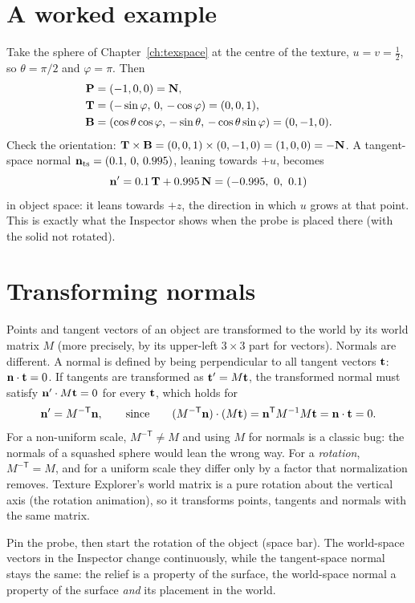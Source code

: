 \section{A worked example}
Take the sphere of Chapter~\ref{ch:texspace} at the centre of the texture, $u=v=\frac12$, so
$\theta=\pi/2$ and $\varphi=\pi$. Then
\begin{align*}
  \mathbf{P} &= (-1,0,0) = \mathbf{N},\\
  \mathbf{T} &= (-\sin\varphi,\,0,\,-\cos\varphi) = (0,0,1),\\
  \mathbf{B} &= (\cos\theta\cos\varphi,\,-\sin\theta,\,-\cos\theta\sin\varphi) = (0,-1,0).
\end{align*}
Check the orientation: $\mathbf{T}\times\mathbf{B} = (0,0,1)\times(0,-1,0) = (1,0,0) = -\mathbf{N}$. A tangent-space
normal $\mathbf{n}_{\mathrm{ts}} = (0.1,\,0,\,0.995)$, leaning towards $+u$, becomes
\[
  \mathbf{n}' = 0.1\,\mathbf{T} + 0.995\,\mathbf{N} = (-0.995,\ 0,\ 0.1)
\]
in object space: it leans towards $+z$, the direction in which $u$ grows at that point. This is
exactly what the Inspector shows when the probe is placed there (with the solid not rotated).

\section{Transforming normals}
\label{sec:normaltransform}

Points and tangent vectors of an object are transformed to the world by its world matrix $M$
(more precisely, by its upper-left $3\times3$ part for vectors). Normals are different. A normal
is defined by being perpendicular to all tangent vectors $\mathbf{t}$: $\mathbf{n}\cdot\mathbf{t} = 0$.
If tangents are transformed as $\mathbf{t}' = M\mathbf{t}$, the transformed normal must satisfy
$\mathbf{n}'\cdot M\mathbf{t} = 0$ for every $\mathbf{t}$, which holds for
\[
  \mathbf{n}' = M^{-\mathsf T}\mathbf{n},\qquad\text{since}\qquad
  (M^{-\mathsf T}\mathbf{n})\cdot(M\mathbf{t}) = \mathbf{n}^{\mathsf T}M^{-1}M\mathbf{t} = \mathbf{n}\cdot\mathbf{t} = 0 .
\]
For a non-uniform scale, $M^{-\mathsf T}\neq M$ and using $M$ for normals is a classic bug: the
normals of a squashed sphere would lean the wrong way. For a \emph{rotation},
$M^{-\mathsf T}=M$, and for a uniform scale they differ only by a factor that normalization
removes. Texture Explorer's world matrix is a pure rotation about the vertical axis (the
rotation animation), so it transforms points, tangents and normals with the same matrix.

\begin{tryit}
Pin the probe, then start the rotation of the object (space bar). The world-space vectors in
the Inspector change continuously, while the tangent-space normal stays the same: the relief is
a property of the surface, the world-space normal a property of the surface \emph{and} its
placement in the world.
\end{tryit}
